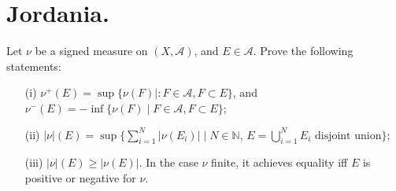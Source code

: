 \documentclass[lang=cn,11pt]{elegantbook}
\begin{document}
 \section{Jordania.}
  Let $\nu$ be a signed measure on $(X,\mathcal{A})$, and $E\in\mathcal{A}$. Prove the following statements:
  \begin{itemize}
  \item[(i)]$\nu^+(E)= \sup\{ \nu(F)\mid: F\in \mathcal{A}, F\subset E\}$, and   $\nu^-(E)= -  \inf\{ \nu(F)\mid  F\in \mathcal{A}, F\subset E\}$; 
  \item[(ii)]   $|\nu|(E)= \sup\{ \sum_{i=1}^N |\nu(E_i)|\mid N\in\mathbb{N}, \, E= \bigcup_{i=1}^N E_i \text{ disjoint union}\}$;
  \item[(iii)]   $|\nu|(E)\ge|\nu(E)|$. In the case $\nu$ finite, it achieves equality iff $E$ is positive or negative for $\nu$.
  \end{itemize}
\end{document}
